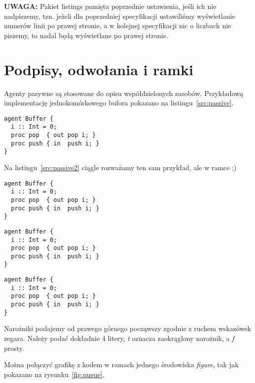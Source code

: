 \documentclass[a4paper,11pt]{article}
\begin{document}
\textbf{UWAGA:} Pakiet listings pamięta poprzednie ustawienia, jeśli ich nie nadpiszemy, tzn. jeżeli dla poprzedniej specyfikacji ustawiliśmy wyświetlanie numerów linii po prawej stronie, a w kolejnej specyfikacji nic o liczbach nie piszemy, to nadal będą wyświetlane po prawej stronie.

\newpage

\section{Podpisy, odwołania i ramki}


Agenty pasywne są stosowane do opisu współdzielonych zasobów. Przykładową implementację jednokomórkowego bufora pokazano na listingu~\ref{src:passive}. 


\begin{lstlisting}[caption=Przykład agenta pasywnego, captionpos=b,
label=src:passive2, firstnumber=12,frame=single]
agent Buffer {
  i :: Int = 0;
  proc pop  { out pop i; }
  proc push { in  push i; }
}
\end{lstlisting}

Na listingu~\ref{src:passive2} ciągle rozważamy ten sam przykład, ale w ramce ;)


\begin{lstlisting}[caption=Przykład agenta pasywnego, captionpos=t,
label=src:passive3, frame=tbLR]
agent Buffer {
  i :: Int = 0;
  proc pop  { out pop i; }
  proc push { in  push i; }
}
\end{lstlisting}

\begin{lstlisting}[caption=Przykład agenta pasywnego, captionpos=t,
label=src:passive4, frame=TB]
agent Buffer {
  i :: Int = 0;
  proc pop  { out pop i; }
  proc push { in  push i; }
}
\end{lstlisting}



\begin{lstlisting}[caption=Przykład agenta pasywnego, captionpos=t,
label=src:passive5, frame=LBtr, frameround=tftf]
agent Buffer {
  i :: Int = 0;
  proc pop  { out pop i; }
  proc push { in  push i; }
}
\end{lstlisting}

Narożniki podajemy od prawego {\color{blue}górnego począwszy zgodnie z} ruchem wskazówek zegara. Należy podać dokładnie 4 litery, \emph{t} oznacza zaokrąglony narożnik, a \emph{f} prosty.

Można połączyć grafikę z kodem w ramach jednego środowiska \emph{figure}, tak jak pokazano na rysunku~\ref{fig:queue}.
\end{document}
